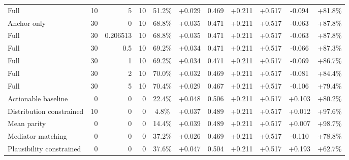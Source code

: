 \begin{table}[htbp]
\begin{tabular}{lrrrccccccc}
Full & 10 & 5 & 10 & 51.2\% & +0.029 & 0.469 & +0.211 & +0.517 & -0.094 & +81.8\% \\
Anchor only & 30 & 0 & 10 & 68.8\% & +0.035 & 0.471 & +0.211 & +0.517 & -0.063 & +87.8\% \\
Full & 30 & 0.206513 & 10 & 68.8\% & +0.035 & 0.471 & +0.211 & +0.517 & -0.063 & +87.8\% \\
Full & 30 & 0.5 & 10 & 69.2\% & +0.034 & 0.471 & +0.211 & +0.517 & -0.066 & +87.3\% \\
Full & 30 & 1 & 10 & 69.2\% & +0.034 & 0.471 & +0.211 & +0.517 & -0.069 & +86.7\% \\
Full & 30 & 2 & 10 & 70.0\% & +0.032 & 0.469 & +0.211 & +0.517 & -0.081 & +84.4\% \\
Full & 30 & 5 & 10 & 70.4\% & +0.029 & 0.467 & +0.211 & +0.517 & -0.106 & +79.4\% \\
Actionable baseline & 0 & 0 & 0 & 22.4\% & +0.048 & 0.506 & +0.211 & +0.517 & +0.103 & +80.2\% \\
Distribution constrained & 10 & 0 & 0 & 4.8\% & +0.037 & 0.489 & +0.211 & +0.517 & +0.012 & +97.6\% \\
Mean parity & 0 & 0 & 0 & 14.4\% & +0.039 & 0.489 & +0.211 & +0.517 & +0.007 & +98.7\% \\
Mediator matching & 0 & 0 & 0 & 37.2\% & +0.026 & 0.469 & +0.211 & +0.517 & -0.110 & +78.8\% \\
Plausibility constrained & 0 & 0 & 0 & 37.6\% & +0.047 & 0.504 & +0.211 & +0.517 & +0.193 & +62.7\% \\
\bottomrule
\end{tabular}
\end{table}